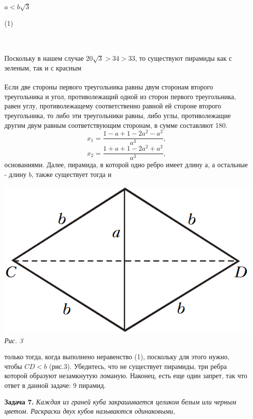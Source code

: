 {\begin{multicols}{3}
\begin{minipage}[b]{0.16666\textwidth}
\raggedleft
$a < b\sqrt{3}$
\end{minipage}%
\begin{minipage}[b]{0.12\textwidth}
\raggedleft
(1)
\end{minipage}%
\\ \\
Поскольку в нашем случае $20\sqrt{3} > 34 > 33$, то существуют пирамиды как
с зеленым, так и с красным\\
\\Если две стороны первого треугольника равны двум сторонам второго треугольника и угол, противолежащий одной из сторон первого треугольника, равен углу, противолежащему соответственно равной ей стороне второго треугольника, то либо эти треугольники равны, либо углы, противолежащие другим двум равным соответствующим сторонам, в сумме составляют 180.
\vfill\null
\[x_1 = \frac{1 - a + {1 - 2a^2 - a^2}}{a^3},\]
\[x_2 = \frac{1 + a + {1 - 2a^2 + a^2}}{a^3},\]
\columnbreak
основаниями. Далее, пирамида, в которой одно ребро имеет длину $а$, а остальные -
длину $b$, также существует тогда и
\begin{minipage}{\linewidth}
\includegraphics[width=\linewidth]{images/picture3.png} \\
\textsl{Рис. 3} \\
\end{minipage}
только тогда, когда выполнено неравенство (1),
поскольку для этого нужно, чтобы
$CD < b$
(рис.3). Убедитесь, что не существует пирамиды, три ребра
которой образуют незамкнутую ломаную. Наконец, есть еще один запрет,
так что ответ в данной задаче: 9 пирамид.\par
\textbf{Задача 7.} \textsl{Каждая из граней куба закрашивается целиком
белым или черным цветом. Раскраски двух кубов называются одинаковыми,
}
\end{multicols}}
